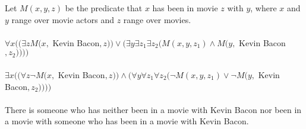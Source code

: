 \documentclass[11pt]{article}
\begin{document}
\begin{enumerate}[label=\textbf{\arabic*.}]
\begin{enumerate}[label=\textbf{\alph*)}]
		Let $M(x, y, z)$ be the predicate that $x$ has been in movie $z$ with $y$, where $x$ and $y$ range over movie actors and $z$ range over movies. \\
		\\
		$\forall x((\exists zM(x,$ Kevin Bacon$, z)) \lor (\exists y\exists z_1\exists z_2(M(x, y, z_1) \land M(y,$ Kevin Bacon$, z_2))))$ \\
		\\
		$\exists x((\forall z\neg M(x,$ Kevin Bacon$, z)) \land (\forall y\forall z_1\forall z_2(\neg M(x, y, z_1) \lor \neg M(y,$ Kevin Bacon$, z_2))))$ \\
		\\
		There is someone who has neither been in a movie with Kevin Bacon nor been in a movie with someone who has been in a movie with Kevin Bacon.
	\end{enumerate}
\end{enumerate}
\end{document}
